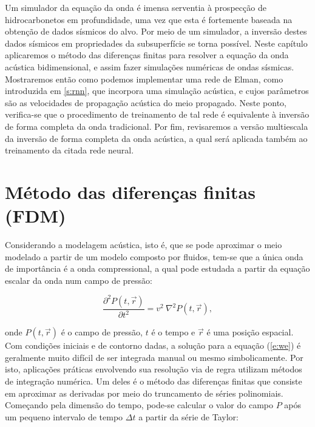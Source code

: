   Um simulador da equação da onda é imensa serventia à prospecção de hidrocarbonetos em profundidade, uma vez que esta é fortemente baseada na obtenção de dados sísmicos do alvo. Por meio de um simulador, a inversão destes dados sísmicos em propriedades da subsuperfície se torna possível. Neste capítulo aplicaremos o método das diferenças finitas para resolver a equação da onda acústica bidimensional, e assim fazer simulações numéricas de ondas sísmicas. Mostraremos então como podemos implementar uma rede de Elman, como introduzida em \ref{s:rnn}, que incorpora uma simulação acústica, e cujos parâmetros são as velocidades de propagação acústica do meio propagado. Neste ponto, verifica-se que o procedimento de treinamento de tal rede é equivalente à inversão de forma completa da onda tradicional. Por fim, revisaremos a versão multiescala da inversão de forma completa da onda acústica, a qual será aplicada também ao treinamento da citada rede neural.

  \section{Método das diferenças finitas (FDM)}  \label{s:fdm}

    Considerando a modelagem acústica, isto é, que se pode aproximar o meio modelado a partir de um modelo composto por fluidos, tem-se que a única onda de importância é a onda compressional, a qual pode \DIFaddbegin {}\DIFaddend estudada a partir da equação escalar da onda num campo de pressão:

    \begin{equation} \label{e:we}
      \frac{\partial^2 P(t,\vec{r})}{\partial t^2} = v^2\ \nabla^2 P(t,\vec{r})
      ,
    \end{equation}

    \noindent onde $P(t,\vec{r})$ é o campo de pressão, $t$ é o tempo e $\vec{r}$ é uma posição espacial. Com condições iniciais e de contorno dadas, a solução para a equação (\ref{e:we}) é geralmente muito difícil de ser integrada manual ou mesmo simbolicamente. Por isto, aplicações práticas envolvendo sua resolução via de regra utilizam métodos de integração numérica. Um deles é o método das diferenças finitas \DIFdelbegin \DIFdel{, }\DIFdelend \DIFaddbegin \DIFadd{(}\textit{}\DIFaddend que consiste em aproximar as derivadas por meio do truncamento de séries polinomiais. Começando pela dimensão do tempo, pode-se calcular o valor do campo $P$ após um pequeno intervalo de tempo $\Delta t$ a partir da série de Taylor:

